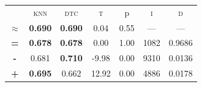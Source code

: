\begin{tabular}{c||cc||c|c|c||c}
\midrule	&\textsc{knn} & \textsc{dtc} & \textsc{t} & p & \textsc{i} & \textsc{d}\\
	\color{black} $\approx$ & \color{black} \bfseries 0.690 &\color{black}  \bfseries 0.690 & 0.04 & 0.55 & --- & ---\\\midrule
	{\bfseries\color{black}\tiny=}& \color{black} \bfseries 0.678 & \color{black} \bfseries 0.678 & 0.00 & 1.00 & 1082 & \color{black} 0.9686\\
	{\bfseries\color{blue}\tiny-}& \color{blue}  0.681 & \color{blue} \bfseries 0.710 & -9.98 & 0.00 & 9310 & \color{blue} 0.0136\\
	{\bfseries\color{red}\tiny+}& \color{red} \bfseries 0.695 & \color{red}  0.662 & 12.92 & 0.00 & 4886 & \color{red} 0.0178\\
\bottomrule\end{tabular}


